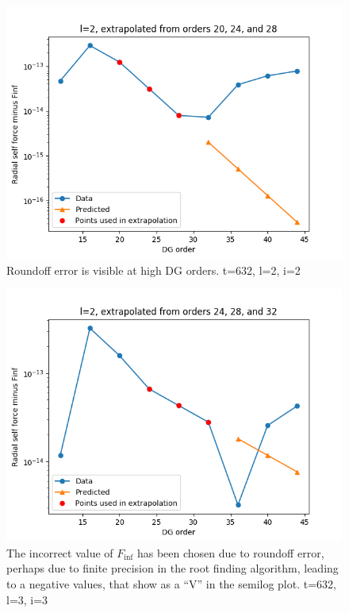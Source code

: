 \begin{figure}
  \includegraphics{extrapolate7t632l2i2}
  \caption{Roundoff error is visible at high DG orders. t=632, l=2, i=2}
  \label{roundoff}
\end{figure}

\begin{figure}
  \includegraphics{extrapolate7t632l2i3}
  \caption{The incorrect value of $F_{\inf}$ has been chosen due to roundoff error, perhaps due to finite precision in the root finding algorithm, leading to a negative values, that show as a ``V'' in the semilog plot. t=632, l=3, i=3}
  \label{offset}
\end{figure}


